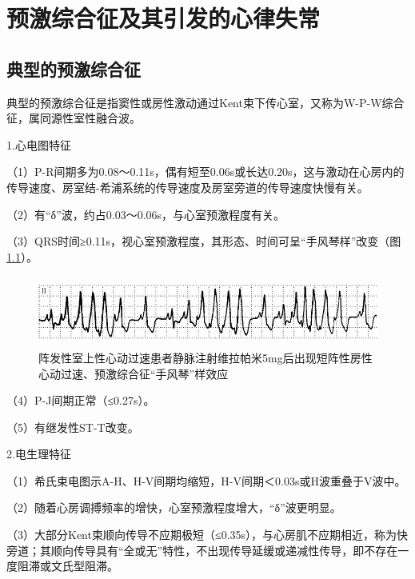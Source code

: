 \protect\hypertarget{text00036.html}{}{}

\protect\hypertarget{text00036.htmlux5cux23chapter36}{}{}

\chapter{预激综合征及其引发的心律失常}

\protect\hypertarget{text00036.htmlux5cux23subid418}{}{}

\section{典型的预激综合征}

典型的预激综合征是指窦性或房性激动通过Kent束下传心室，又称为W-P-W综合征，属同源性室性融合波。

1.心电图特征

（1）P-R间期多为0.08～0.11s，偶有短至0.06s或长达0.20s，这与激动在心房内的传导速度、房室结-希浦系统的传导速度及房室旁道的传导速度快慢有关。

（2）有“δ”波，约占0.03～0.06s，与心室预激程度有关。

（3）QRS时间≥0.11s，视心室预激程度，其形态、时间可呈“手风琴样”改变（图\ref{fig29-1}）。

\begin{figure}[!htbp]
 \centering
 \includegraphics[width=5.60417in,height=0.91667in]{./images/Image00481.jpg}
 \captionsetup{justification=centering}
 \caption{阵发性室上性心动过速患者静脉注射维拉帕米5mg后出现短阵性房性心动过速、预激综合征“手风琴”样效应}
 \label{fig29-1}
  \end{figure} 

（4）P-J间期正常（≤0.27s）。

（5）有继发性ST-T改变。

2.电生理特征

（1）希氏束电图示A-H、H-V间期均缩短，H-V间期＜0.03s或H波重叠于V波中。

（2）随着心房调搏频率的增快，心室预激程度增大，“δ”波更明显。

（3）大部分Kent束顺向传导不应期极短（≤0.35s），与心房肌不应期相近，称为快旁道；其顺向传导具有“全或无”特性，不出现传导延缓或递减性传导，即不存在一度阻滞或文氏型阻滞。

